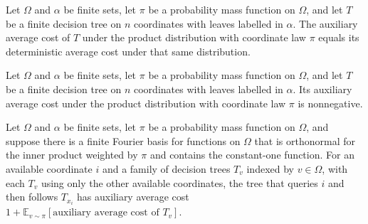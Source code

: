 \begin{theorem}
\label{FABL.FiniteDecisionTree.auxiliaryAverageCost_complete}
\leanok
{}
Let $\Omega$ and $\alpha$ be finite sets, let $\pi$ be a probability mass function on
$\Omega$, and let $T$ be a finite decision tree on $n$ coordinates with leaves labelled
in $\alpha$. The auxiliary average cost of $T$ under the product distribution with
coordinate law $\pi$ equals its deterministic average cost under that same distribution.
\end{theorem}

\begin{theorem}
\label{FABL.FiniteDecisionTree.auxiliaryAverageCost_nonneg}
\leanok
{}
Let $\Omega$ and $\alpha$ be finite sets, let $\pi$ be a probability mass function on
$\Omega$, and let $T$ be a finite decision tree on $n$ coordinates with leaves labelled
in $\alpha$. Its auxiliary average cost under the product distribution with coordinate
law $\pi$ is nonnegative.
\end{theorem}

\begin{theorem}
\label{FABL.FiniteDecisionTree.auxiliaryAverageCost_query}
\leanok
{}
Let $\Omega$ and $\alpha$ be finite sets, let $\pi$ be a probability mass function on
$\Omega$, and suppose there is a finite Fourier basis for functions on $\Omega$ that is
orthonormal for the inner product weighted by $\pi$ and contains the constant-one
function. For an available coordinate $i$ and a family of decision trees $T_v$ indexed
by $v\in\Omega$, with each $T_v$ using only the other available coordinates, the tree
that queries $i$ and then follows $T_{x_i}$ has auxiliary average cost
$1+\mathbb{E}_{v\sim\pi}[\text{auxiliary average cost of }T_v]$.
\end{theorem}

